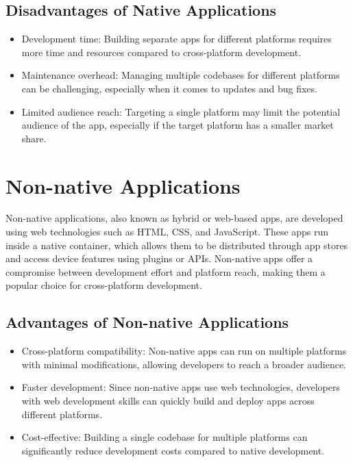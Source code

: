 \documentclass[journal,comsoc]{IEEEtran}
\begin{document}
	\subsection{Disadvantages of Native Applications}
	\begin{itemize}
		\item Development time: Building separate apps for different platforms requires more time and resources compared to cross-platform development.
		\item Maintenance overhead: Managing multiple codebases for different platforms can be challenging, especially when it comes to updates and bug fixes.
		\item Limited audience reach: Targeting a single platform may limit the potential audience of the app, especially if the target platform has a smaller market share.
	\end{itemize}
	
	\section{Non-native Applications}
	Non-native applications, also known as hybrid or web-based apps, are developed using web technologies such as HTML, CSS, and JavaScript. These apps run inside a native container, which allows them to be distributed through app stores and access device features using plugins or APIs. Non-native apps offer a compromise between development effort and platform reach, making them a popular choice for cross-platform development.
	
	\subsection{Advantages of Non-native Applications}
	\begin{itemize}
		\item Cross-platform compatibility: Non-native apps can run on multiple platforms with minimal modifications, allowing developers to reach a broader audience.
		\item Faster development: Since non-native apps use web technologies, developers with web development skills can quickly build and deploy apps across different platforms.
		\item Cost-effective: Building a single codebase for multiple platforms can significantly reduce development costs compared to native development.
	\end{itemize}
	
\end{document}
